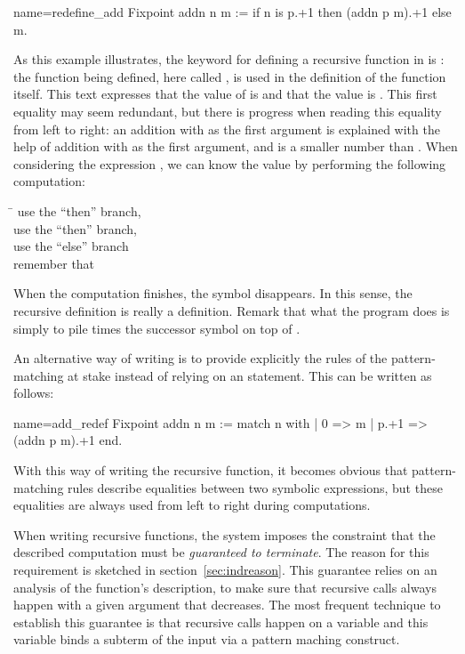 \begin{coq}{name=redefine_add}{}
Fixpoint addn n m :=
  if n is p.+1 then (addn p m).+1 else m.
\end{coq}
As this example illustrates, the keyword for defining a recursive
function in \Coq{} is : the function being
defined, here called , is used in the definition of the
function  itself.  This text expresses that the value of
 is
 and that the value  is .
This first equality may
seem redundant, but there is progress when reading this equality from
left to right: an addition with  as the first argument
is explained with the help of addition with  as the first
argument, and  is a smaller number than .  When considering the
expression , we can know the value by performing the following
computation:
\begin{tabbing}
\=\kill
{} \> use the ``then'' branch, \\
 \> use the ``then'' branch, \\
 \> use the ``else'' branch\\
\> remember that 
\end{tabbing}
When the computation finishes, the symbol  disappears.  In
this sense, the recursive definition is really a definition.  Remark that
what the  program does is simply to pile  times the
successor symbol on top of .

An alternative way of writing  is to provide explicitly the
rules of the pattern-matching at stake instead of relying on an 
statement. This can be written as follows:

\begin{coq}{name=add_redef}{}
Fixpoint addn n m :=
  match n with
  | 0 => m
  | p.+1 => (addn p m).+1
  end.
\end{coq}
With this way of writing the recursive function, it becomes obvious that
pattern-matching rules describe equalities between two symbolic
expressions, but these equalities are always used from left to right during
computations.

When writing recursive functions, the \Coq{} system imposes the
constraint that the described computation must be \emph{guaranteed to
terminate}.  The reason for this requirement is sketched in
section~\ref{sec:indreason}.
This guarantee relies on an analysis of the function's
description, to make sure that recursive calls always happen with a
given argument that decreases.  The most frequent technique to
establish this guarantee is that recursive calls happen on a variable
and this variable binds a subterm of the input via a pattern maching
construct.

